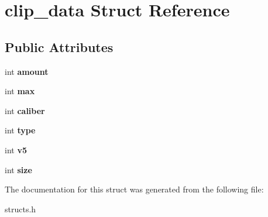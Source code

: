 \hypertarget{structclip__data}{\section{clip\-\_\-data Struct Reference}
\label{structclip__data}
}
\subsection*{Public Attributes}
\begin{DoxyCompactItemize}
\item 
\hypertarget{structclip__data_a293644cd04761437ea5219aaad96b323}{int {\bfseries amount}}\label{structclip__data_a293644cd04761437ea5219aaad96b323}

\item 
\hypertarget{structclip__data_a3f7387b26f105100bf16668b1e6d087d}{int {\bfseries max}}\label{structclip__data_a3f7387b26f105100bf16668b1e6d087d}

\item 
\hypertarget{structclip__data_a2a4daf8e05d84ea4fffb8b805e32838e}{int {\bfseries caliber}}\label{structclip__data_a2a4daf8e05d84ea4fffb8b805e32838e}

\item 
\hypertarget{structclip__data_a04ac29308b00699c96f6b652e45d4e2e}{int {\bfseries type}}\label{structclip__data_a04ac29308b00699c96f6b652e45d4e2e}

\item 
\hypertarget{structclip__data_a667e11ffc4de60b5dc2fd80d501485a5}{int {\bfseries v5}}\label{structclip__data_a667e11ffc4de60b5dc2fd80d501485a5}

\item 
\hypertarget{structclip__data_a6cd1820a754972b4415591114fd2f94b}{int {\bfseries size}}\label{structclip__data_a6cd1820a754972b4415591114fd2f94b}

\end{DoxyCompactItemize}


The documentation for this struct was generated from the following file\-:\begin{DoxyCompactItemize}
\item 
structs.\-h\end{DoxyCompactItemize}
